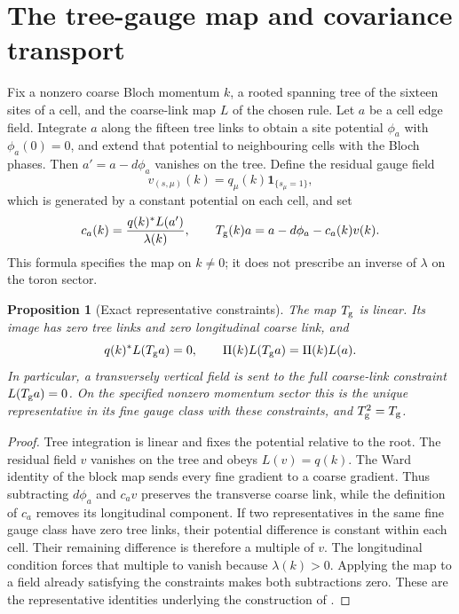 \documentclass[11pt,oneside,openany]{book}
\newtheorem{proposition}[proposition]{Proposition}
\theoremstyle{definition}
\theoremstyle{remark}
\newcommand{\one}{\mathbf1}
\newcommand{\src}[2]{\cite[#2]{#1}}
\begin{document}
\section{The tree-gauge map and covariance transport}
\label{sec:tree-gauge}
Fix a nonzero coarse Bloch momentum $k$, a rooted spanning tree of the
sixteen sites of a cell, and the coarse-link map $L$ of the chosen rule.
Let $a$ be a cell edge field. Integrate $a$ along the fifteen tree links to
obtain a site potential $\phi_a$ with $\phi_a(0)=0$, and extend that
potential to neighbouring cells with the Bloch phases. Then
$a'=a-d\phi_a$ vanishes on the tree. Define the residual gauge field
\[
v_{(s,\mu)}(k)=q_\mu(k)\one_{\{s_\mu=1\}},
\]
which is generated by a constant potential on each cell, and set
\begin{equation}\label{eq:tree-gauge-map}
c_a(k)=\frac{q(k)^*L(a')}{\lambda(k)},\qquad
T_{\rm g}(k)a=a-d\phi_a-c_a(k)v(k).
\end{equation}
This formula specifies the map on $k\ne0$; it does not prescribe an inverse
of $\lambda$ on the toron sector.

\begin{proposition}[Exact representative constraints]
\label{prop:tree-gauge-constraints}
The map $T_{\rm g}$ is linear. Its image has zero tree links and zero
longitudinal coarse link, and
\begin{equation}\label{eq:tree-gauge-constraints}
q(k)^*L(T_{\rm g}a)=0,\qquad
\Pi(k)L(T_{\rm g}a)=\Pi(k)L(a).
\end{equation}
In particular, a transversely vertical field is sent to the full
coarse-link constraint $L(T_{\rm g}a)=0$. On the specified nonzero momentum
sector this is the unique representative in its fine gauge class with
these constraints, and $T_{\rm g}^2=T_{\rm g}$.
\end{proposition}
\begin{proof}
Tree integration is linear and fixes the potential relative to the root.
The residual field $v$ vanishes on the tree and obeys $L(v)=q(k)$. The
Ward identity of the block map sends every fine gradient to a coarse
gradient. Thus subtracting $d\phi_a$ and $c_av$ preserves the transverse
coarse link, while the definition of $c_a$ removes its longitudinal
component. If two representatives in the same fine gauge class have zero
tree links, their potential difference is constant within each cell. Their
remaining difference is therefore a multiple of $v$. The longitudinal
condition forces that multiple to vanish because $\lambda(k)>0$.
Applying the map to a field already satisfying the constraints makes both
subtractions zero. These are the representative identities underlying the
construction of \src{F11}{V41}.
\end{proof}
\end{document}
